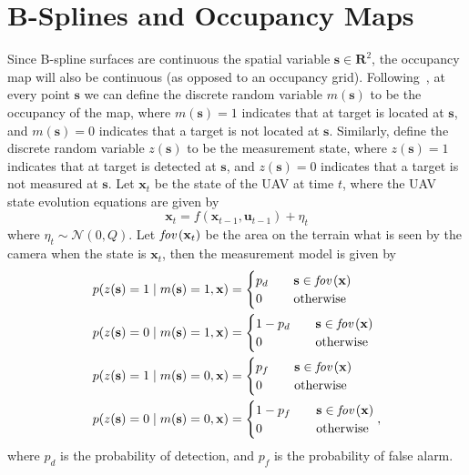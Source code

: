 \documentclass{article}
\newcommand{\fov}[1]{\text{\em fov}\left(#1\right)}
\newcommand{\sbf}{\mathbf{s}}
\newcommand{\ubf}{\mathbf{u}}
\newcommand{\xbf}{\mathbf{x}}
\begin{document}
\section{B-Splines and Occupancy Maps}

Since B-spline surfaces are continuous the spatial variable $\sbf\in\mathbf{R}^2$, the occupancy map will also be continuous (as opposed to an occupancy grid).  Following~\cite{RodriguesTsiogkasAguiar20}, at every point $\sbf$ we can define the discrete random variable $m(\sbf)$ to be the occupancy of the map, where $m(\sbf)=1$ indicates that at target is located at $\sbf$, and $m(\sbf)=0$ indicates that a target is not located at $\sbf$.  
%
Similarly, define the discrete random variable $z(\sbf)$ to be the measurement state, where $z(\sbf)=1$ indicates that at target is detected at $\sbf$, and $z(\sbf)=0$ indicates that a target is not measured at $\sbf$.
% 
Let $\xbf_t$ be the state of the UAV at time $t$, where the UAV state evolution equations are given by
\[
\xbf_t = f(\xbf_{t-1}, \ubf_{t-1}) + \eta_t
\]
where $\eta_t\sim\mathcal{N}(0, Q)$. Let $\fov{\xbf_t}$ be the area on the terrain what is seen by the camera when the state is $\xbf_t$, then the measurement model is given by
%
\begin{align}
	p(z(\sbf)=1 \mid m(\sbf)=1, \xbf) &= \begin{cases}
 											p_d &\quad \mathbf{s}\in\fov{\xbf} \\
 											0 &\quad \text{otherwise}
 										 \end{cases} 
	\label{eq:prob_z=1:m=1}\\
	p(z(\sbf)=0 \mid m(\sbf)=1, \xbf) &= \begin{cases}
 											1-p_d &\quad \mathbf{s}\in\fov{\xbf} \\
 											0 &\quad \text{otherwise}
 										 \end{cases}
	\label{eq:prob_z=0:m=1}\\
	p(z(\sbf)=1 \mid m(\sbf)=0, \xbf) &= \begin{cases}
 											p_f &\quad \mathbf{s}\in\fov{\xbf} \\
 											0 &\quad \text{otherwise}
 										  \end{cases}
	\label{eq:prob_z=1:m=0}\\
	p(z(\sbf)=0 \mid m(\sbf)=0, \xbf) &= \begin{cases}
 											1-p_f &\quad \mathbf{s}\in\fov{\xbf} \\
 											0 &\quad \text{otherwise}
 										  \end{cases},
 	\label{eq:prob_z=1:m=0}
\end{align}
where $p_d$ is the probability of detection, and $p_f$ is the probability of false alarm.
\end{document}
